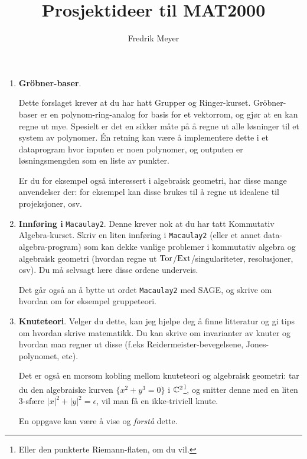 \documentclass[11pt, english]{article}
\begin{document}
\title{Prosjektideer til MAT2000}
\author{Fredrik Meyer}
\date{}
\maketitle 

\begin{enumerate}
\item \textbf{Gröbner-baser}.

Dette forslaget krever at du har hatt Grupper og Ringer-kurset. Gröbner-baser er en polynom-ring-analog for basis for et vektorrom, og gjør at en kan regne ut mye. Spesielt er det en sikker måte på å regne ut alle løsninger til et system av polynomer. Én retning kan være å implementere dette i et dataprogram hvor inputen er noen polynomer, og outputen er løsningsmengden som en liste av punkter.

Er du for eksempel også interessert i algebraisk geometri, har disse mange anvendelser der: for eksempel kan disse brukes til å regne ut idealene til projeksjoner, osv.

\item \textbf{Innføring i} \verb|Macaulay2|. Denne krever nok at du har tatt Kommutativ Algebra-kurset. Skriv en liten innføring i \verb|Macaulay2| (eller et annet data-algebra-program) som kan dekke vanlige problemer i kommutativ algebra og algebraisk geometri (hvordan regne ut $\operatorname{\mathrm{Tor}}$/$\operatorname{\mathrm{Ext}}$/singulariteter, resolusjoner, osv). Du må selvsagt lære disse ordene underveis.

Det går også an å bytte ut ordet \verb|Macaulay2| med SAGE, og skrive om hvordan om for eksempel gruppeteori.

\item \textbf{Knuteteori}. Velger du dette, kan jeg hjelpe deg å finne litteratur og gi tips om hvordan skrive matematikk. Du kan skrive om invarianter av knuter og hvordan man regner ut disse (f.eks Reidermeister-bevegelsene, Jones-polynomet, etc).

Det er også en morsom kobling mellom knuteteori og algebraisk geometri: tar du den algebraiske kurven $\{ x^2+y^3 = 0 \}$ i $\mathbb{C}^2$\footnote{Eller den punkterte Riemann-flaten, om du vil.}, og snitter denne med en liten $3$-sfære $\lvert x \rvert ^2 + \lvert y \rvert ^2 = \epsilon$, vil man få en ikke-triviell knute.

En oppgave kan være å vise og \emph{forstå} dette.
\end{enumerate}
\end{document}
